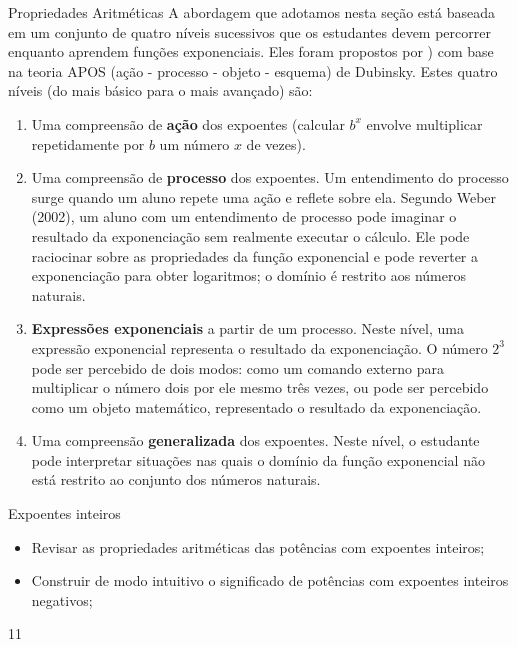 \begin{paginatexto}{Propriedades Aritméticas}
A abordagem que adotamos nesta seção está baseada em um conjunto de quatro níveis sucessivos que os estudantes devem percorrer enquanto aprendem funções exponenciais. Eles foram propostos por \citep{Weber2002}) com base na teoria APOS (ação - processo - objeto - esquema) de Dubinsky. Estes quatro níveis (do mais básico para o mais avançado) são:

\begin{enumerate}[label=\titem{\arabic*.}]
\item  Uma compreensão de \textbf{ação} dos expoentes (calcular $b^{x}$ envolve multiplicar repetidamente por $b$ um número $x$ de vezes).
\item  Uma compreensão de \textbf{processo} dos expoentes. Um entendimento do processo surge quando um aluno repete uma ação e reflete sobre ela. Segundo Weber (2002), um aluno com um entendimento de processo pode imaginar o resultado da exponenciação sem realmente executar o cálculo. Ele pode raciocinar sobre as propriedades da função exponencial e pode reverter a exponenciação para obter logaritmos; o domínio é restrito aos números naturais.

\item  \textbf{Expressões exponenciais} a partir de um processo. Neste nível, uma expressão exponencial representa o resultado da exponenciação. O número $2^{3}$ pode ser percebido de dois modos: como um comando externo para multiplicar o número dois por ele mesmo três vezes, ou pode ser percebido como um objeto matemático, representado o resultado da exponenciação.

\item  Uma compreensão \textbf{generalizada} dos expoentes. Neste nível, o estudante pode interpretar situações nas quais o domínio da função exponencial não está restrito ao conjunto dos números naturais.
\end{enumerate}
\end{paginatexto}
\def\currentcolor{session1}
\begin{objectives}{Expoentes inteiros}
{
\begin{itemize}
\item Revisar as propriedades aritméticas das potências com expoentes inteiros;
\item Construir de modo intuitivo o significado de potências com expoentes inteiros negativos;

\end{itemize}
}{1}{1}
\end{objectives}

